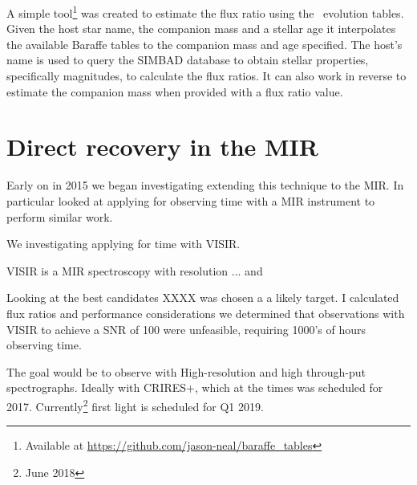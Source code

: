 A simple tool\footnote{Available at \url{https://github.com/jason-neal/baraffe_tables}} was created to estimate the flux ratio using the~\citep{baraffe_evolutionary_2003,baraffe_new_2015} evolution tables. Given the host star name, the companion mass and a stellar age it interpolates the available Baraffe tables to the companion mass and age specified. The host's name is used to query the SIMBAD database to obtain stellar properties, specifically magnitudes, to calculate the flux ratios. It can also work in reverse to estimate the companion mass when provided with a flux ratio value.





\section{Direct recovery in the MIR}
Early on in 2015 we began investigating extending this technique to the MIR. In particular looked at applying for observing time with a MIR instrument to perform similar work.

We investigating applying for time with VISIR.

VISIR is a MIR spectroscopy with resolution ... and

Looking at the best candidates XXXX was chosen a a likely target. I calculated flux ratios and performance considerations we determined that observations with VISIR to achieve a SNR of 100 were unfeasible, requiring 1000's of hours observing time.

The goal would be to observe with High-resolution and high through-put spectrographs. Ideally with CRIRES+, which at the times was scheduled for 2017. Currently\footnote{June 2018} first light is scheduled for Q1 2019.




